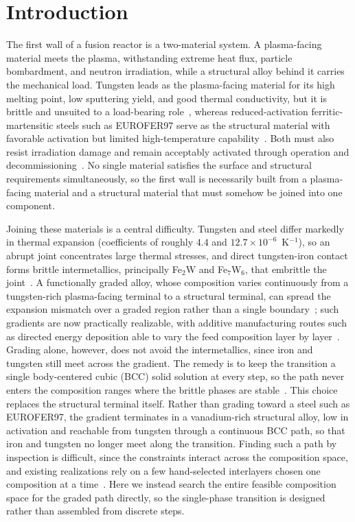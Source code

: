 \section{Introduction}

The first wall of a fusion reactor is a two-material system. A plasma-facing
material meets the plasma, withstanding extreme heat flux, particle bombardment,
and neutron irradiation, while a structural alloy behind it carries the mechanical
load. Tungsten leads as the plasma-facing material for its high melting point, low
sputtering yield, and good thermal conductivity, but it is brittle and unsuited to a load-bearing role~\cite{tungstenPFMreview2023}, whereas reduced-activation
ferritic-martensitic steels such as EUROFER97 serve as the structural material
with favorable activation but limited high-temperature
capability~\cite{lindau2005eurofer,RAFMreview2017}. Both must also resist
irradiation damage and remain acceptably activated through operation and
decommissioning~\cite{zinkle2000operating,bloom2007critical}. No single material
satisfies the surface and structural requirements simultaneously, so the first
wall is necessarily built from a plasma-facing material and a structural material
that must somehow be joined into one component.

Joining these materials is a central difficulty. Tungsten and steel differ
markedly in thermal expansion (coefficients of roughly \(4.4\) and
\(12.7 \times 10^{-6}\)~K\(^{-1}\)), so an abrupt joint concentrates large thermal
stresses, and direct tungsten-iron contact forms brittle intermetallics,
principally Fe\(_2\)W and Fe\(_7\)W\(_6\), that embrittle the
joint~\cite{fgmWsteelCGS2022,karim2024wire}. A functionally graded alloy, whose
composition varies continuously from a tungsten-rich plasma-facing terminal to a
structural terminal, can spread the expansion mismatch over a graded region rather
than a single boundary~\cite{fgmWEurofer2015}; such gradients are now
practically realizable, with additive manufacturing routes such as directed
energy deposition able to vary the feed composition layer by
layer~\cite{karim2024wire}. Grading alone, however, does not avoid the intermetallics, since iron and
tungsten still meet across the gradient. The remedy is to keep the transition
a single body-centered cubic (BCC) solid solution at every step, so the path
never enters the composition ranges where the brittle phases are
stable~\cite{fgmWsteelInterlayerBCC2023}. This choice replaces the structural
terminal itself. Rather than grading toward a steel such as EUROFER97, the
gradient terminates in a vanadium-rich structural alloy, low in activation
and reachable from tungsten through a continuous BCC path, so that iron and
tungsten no longer meet along the transition. Finding such a path by
inspection is difficult, since the constraints interact across the
composition space, and existing realizations rely on a few hand-selected
interlayers chosen one composition at a
time~\cite{fgmWsteelInterlayerBCC2023}. Here we instead search the entire
feasible composition space for the graded path directly, so the single-phase
transition is designed rather than assembled from discrete steps.

